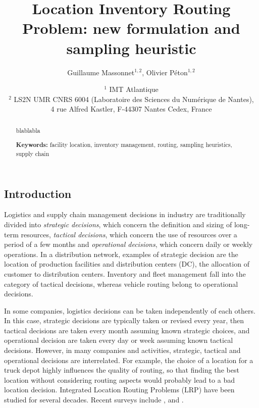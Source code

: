 \documentclass[a4paper,10pt]{article}
\title{Location Inventory Routing Problem: new formulation and sampling heuristic}
\author{Guillaume Massonnet$^{1,2}$, Olivier P\'eton$^{1,2}$}
\date{$^1$ IMT Atlantique\\ 
	$^2$ LS2N UMR CNRS 6004 (Laboratoire des Sciences du Numérique de Nantes), \\ 4 rue Alfred Kastler, F-44307 Nantes Cedex, France}
\begin{document}
	
\maketitle

\begin{abstract}
	blablabla
	
	
\textbf{Keywords:}	facility location, inventory management, routing, sampling heuristics, supply chain
	
\end{abstract}





\modulolinenumbers[5]
\linenumbers
\begin{linenumbers}


\section{Introduction}


Logistics and supply chain management decisions in industry are traditionally divided into 
\textit{strategic decisions}, which concern the definition and sizing of long-term resources, 
\textit{tactical decisions}, which concern the use of resources over a period of a few months and 
\textit{operational decisions}, which concern daily or weekly operations. 
In a distribution network, examples of strategic decision are the location of production facilities and distribution centers (DC), the allocation of customer to distribution centers. 
Inventory and fleet management fall into the category of tactical decisions,
 whereas vehicle routing belong to operational decisions. 

In some companies, logistics decisions can be taken independently of each others. 
In this case, strategic decisions are typically taken or revised every year, then tactical decisions are taken every month assuming known strategic choices, and operational decision are taken every day or week assuming known tactical decisions. 
However, in many companies and activities, strategic, tactical and operational decisions are interrelated. 
For example, the choice of a location for a truck depot highly influences the quality of routing, so that finding the best location without considering routing aspects would probably lead to a bad location decision.  Integrated Location Routing Problems (LRP) have been studied for several decades. Recent surveys include \cite{ProdhonPrins2014}, \cite{DrexlSchneider2015} and \cite{Schneider2017}.  
  


\end{linenumbers}
\end{document}
